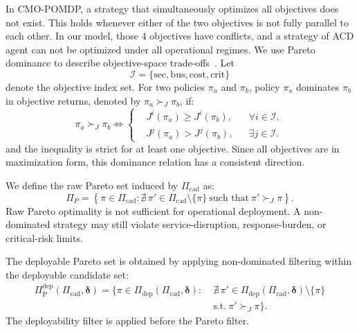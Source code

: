 \documentclass[sigconf,review,anonymous]{acmart}
\begin{document}
In CMO-POMDP, a strategy that simultaneously optimizes all objectives does not exist. This holds whenever either of the two objectives is not fully parallel to each other. 
In our model, those 4 objectives have conflicts, and a strategy of ACD agent can not be optimized under all operational regimes.
We use Pareto dominance to describe objective-space trade-offs~\cite{roijers2013survey,hayes2022practical}.
Let
\[
\mathcal I=
\{
\mathrm{sec},
\mathrm{bus},
\mathrm{cost},
\mathrm{crit}
\}
\]
denote the objective index set. For two policies \(\pi_a\) and
\(\pi_b\), policy \(\pi_a\) dominates \(\pi_b\) in objective returns,
denoted by \(\pi_a\succ_J\pi_b\), if:
\begin{equation}
\pi_a \succ_J \pi_b
\iff
\left\{
\begin{aligned}
&J^{i}(\pi_a)\ge J^{i}(\pi_b),
&& \forall i\in\mathcal I,\\
&J^{j}(\pi_a)>J^{j}(\pi_b),
&& \exists j\in\mathcal I .
\end{aligned}
\right.
\label{eq:pareto-dominance}
\end{equation}
and the inequality is strict for at least one objective.
Since all objectives are in maximization form, this dominance relation has a consistent direction.

We define the raw Pareto set induced by \(\Pi_{\mathrm{cad}}\) as:
\begin{equation}
\Pi_P=\left\{\pi \in \Pi_{\mathrm{cad}}: \nexists\,\pi' \in \Pi_{\mathrm{cad}} \setminus\{\pi\}
\ \text{such that}\ \pi'\succ_J \pi\right\}.
\label{eq:raw-pareto-set}
\end{equation}
Raw Pareto optimality is not sufficient for operational deployment. A
non-dominated strategy may still violate service-disruption,
response-burden, or critical-risk limits.

The deployable Pareto set is obtained by applying non-dominated filtering
within the deployable candidate set:
\begin{equation}
\begin{aligned}
\Pi_{\mathrm{P}}^{\mathrm{dep}}
(\Pi_{\mathrm{cad}},\boldsymbol{\delta})
=
\bigl\{
\pi\in
\Pi_{\mathrm{dep}}(\Pi_{\mathrm{cad}},\boldsymbol{\delta})
:\;&
\nexists\,
\pi'\in
\Pi_{\mathrm{dep}}(\Pi_{\mathrm{cad}},\boldsymbol{\delta})
\setminus\{\pi\}
\\
&\mathrm{s.t.}\ 
\pi'\succ_J \pi
\bigr\}.
\end{aligned}
\label{eq:acceptable-pareto-set}
\end{equation}
The deployability filter is applied before the Pareto filter. 
\end{document}
